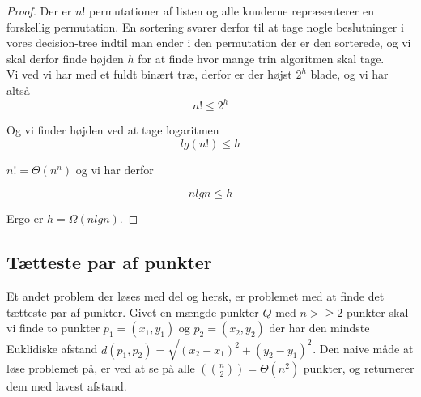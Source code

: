 \begin{proof}
  Der er $n!$ permutationer af listen og alle knuderne repræsenterer en forskellig permutation. En sortering svarer derfor til at tage nogle beslutninger i vores decision-tree indtil man ender i den permutation der er den sorterede, og vi skal derfor finde højden $h$ for at finde hvor mange trin algoritmen skal tage.\\

  Vi ved vi har med et fuldt binært træ, derfor er der højst $2^h$ blade, og vi har altså
  $$n! \leq 2^h$$

  Og vi finder højden ved at tage logaritmen
  $$lg(n!) \leq h$$

  $n! = \Theta(n^n)$ og vi har derfor

  $$nlgn \leq h$$

  Ergo er $h = \Omega(nlgn)$.
\end{proof}



\subsection{Tætteste par af punkter}
Et andet problem der løses med del og hersk, er problemet med at finde det tætteste par af punkter. Givet en mængde punkter $Q$ med $n > \geq 2$ punkter skal vi finde to punkter $p_1 = (x_1, y_1)$ og $p_2 = (x_2, y_2)$ der har den mindste Euklidiske afstand $d(p_1, p_2) = \sqrt{(x_2 - x_1)^2 + (y_2 - y_1)^2}$. Den naive måde at løse problemet på, er ved at se på alle $(n \choose 2) = \Theta(n^2)$ punkter, og returnerer dem med lavest afstand.\\

